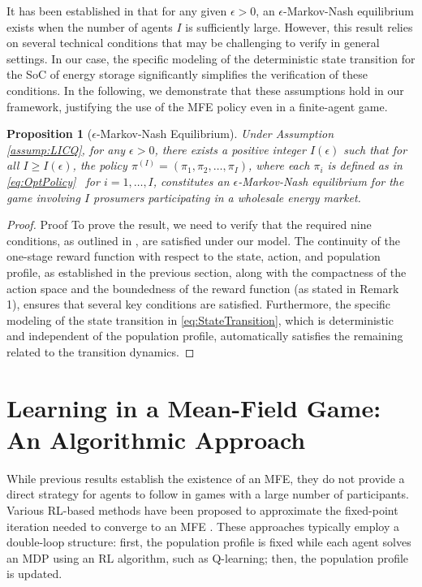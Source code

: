 \documentclass{article}
\theoremstyle{definition}
\theoremstyle{plain}
\newtheorem{proposition}{Proposition}
\begin{document}
It has been established in \cite{MarkovNash} that for any given $\epsilon > 0$, an $\epsilon$-Markov-Nash equilibrium exists when the number of agents $I$ is sufficiently large. However, this result relies on several technical conditions that may be challenging to verify in general settings.
In our case, the specific modeling of the deterministic state transition for the SoC of energy storage significantly simplifies the verification of these conditions. In the following, we demonstrate that these assumptions hold in our framework, justifying the use of the MFE policy even in a finite-agent game. 

\begin{proposition}[$\epsilon$-Markov-Nash Equilibrium]\label{prop:epsilon_MNE}
	Under Assumption \ref{assump:LICQ}, for any \( \epsilon > 0 \), there exists a positive integer \( I(\epsilon) \) such that for all \( I \geq I(\epsilon) \), the policy \( \pi^{(I)} = (\pi_1, \pi_2, \ldots, \pi_I) \), where each \( \pi_i \) is defined as in \eqref{eq:OptPolicy} \ for \( i = 1, \ldots, I \), constitutes an \( \epsilon \)-Markov-Nash equilibrium for the game involving \( I \) prosumers participating in a wholesale energy market.
\end{proposition}
\begin{proof}{Proof}
	To prove the result, we need to verify that the required nine conditions, as outlined in \cite{MarkovNash}, are satisfied under our model. 
	The continuity of the one-stage reward function with respect to the state, action, and population profile, as established in the previous section, along with the compactness of the action space and the boundedness of the reward function (as stated in Remark 1), ensures that several key conditions are satisfied. Furthermore, the specific modeling of the state transition in \eqref{eq:StateTransition}, which is deterministic and independent of the population profile, automatically satisfies the remaining related to the transition dynamics. %
\end{proof}

\section{Learning in a Mean-Field Game: An Algorithmic Approach}
\label{sec:algo}
While previous results establish the existence of an MFE, they do not provide a direct strategy for agents to follow in games with a large number of participants. Various RL-based methods have been proposed to approximate the fixed-point iteration needed to converge to an MFE \citep{guo2019learning,guo2023general}. These approaches typically employ a double-loop structure: first, the population profile is fixed while each agent solves an MDP using an RL algorithm, such as Q-learning; then, the population profile is updated.
\end{document}
